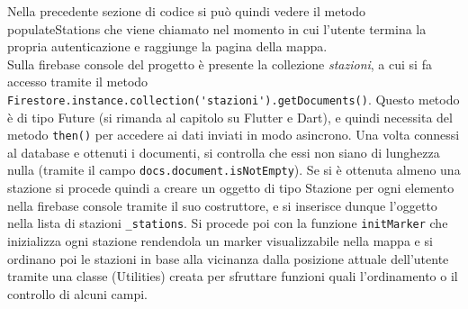 Nella precedente sezione di codice si può quindi vedere il metodo populateStations che viene
chiamato nel momento in cui l'utente termina la propria autenticazione e
raggiunge la pagina della mappa. \\ Sulla firebase console del progetto è presente
la collezione \textit{stazioni}, a cui si fa accesso tramite il
metodo \verb|Firestore.instance.collection('stazioni').getDocuments()|. Questo
metodo è di tipo Future (si rimanda al capitolo su Flutter e Dart), e quindi
necessita del metodo \verb|then()| per accedere ai dati inviati in modo
asincrono. Una volta connessi al database e ottenuti i documenti, si controlla
che essi non siano di lunghezza nulla (tramite il campo
\verb|docs.document.isNotEmpty|). Se si è ottenuta almeno una stazione si
procede quindi a creare un oggetto di tipo Stazione per ogni elemento nella
firebase console tramite il suo costruttore, e si inserisce dunque l'oggetto
nella lista di stazioni \verb|_stations|. Si procede poi con la funzione
\verb|initMarker| che inizializza ogni stazione rendendola un marker
visualizzabile nella mappa e si ordinano poi le stazioni in base alla vicinanza
dalla posizione attuale dell'utente tramite una classe (Utilities) creata per
sfruttare funzioni quali l'ordinamento o il controllo di alcuni campi.


